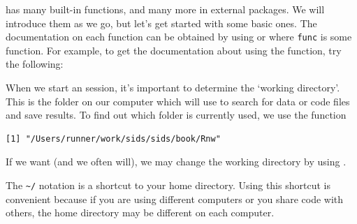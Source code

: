 \R has many built-in functions, and many more in external packages. We will introduce them as we go, but let's get started with some basic ones.
The documentation on each function can be obtained by using  or  where \texttt{func} is some function. For example, to get the documentation about using the  function, try the following:
\begin{knitrout}
\color{fgcolor}\begin{kframe}
\begin{alltt}
\end{alltt}
\end{kframe}
\end{knitrout}

When we start an \R session, it's important to determine the `working directory'. This is the folder on our computer which \R will use to search for data or code files and save results. To find out which folder is currently used, we use the  function
\begin{knitrout}
\color{fgcolor}\begin{kframe}
\begin{alltt}
\hlstd{()}
\end{alltt}
\begin{verbatim}
[1] "/Users/runner/work/sids/sids/book/Rnw"
\end{verbatim}
\end{kframe}
\end{knitrout}

If we want (and we often will), we may change the working directory by using .  
\begin{knitrout}
\color{fgcolor}\begin{kframe}
\begin{alltt}
\hlstd{(}\hlstd{)}
\end{alltt}
\end{kframe}
\end{knitrout}
The \verb|~/| notation is a shortcut to your home directory. Using this shortcut is convenient because if you are using different computers or you share code with others, the home directory may be different on each computer.

